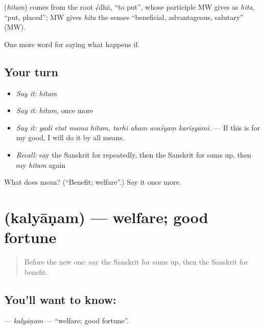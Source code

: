 \begin{cousinweb}
\textbf{} (\emph{hitam}) comes from the root √dhā, \textquotedblleft{}to put\textquotedblright{}, whose participle MW gives as \emph{hita}, \textquotedblleft{}put, placed\textquotedblright{}; MW gives \emph{hita} the senses \textquotedblleft{}beneficial, advantageous, salutary\textquotedblright{} (MW).
\end{cousinweb}

\begin{grammarlens}[title={What you've built}]
One more word for saying what happens if.
\end{grammarlens}

\subsection*{Your turn}
\begin{itemize}
\raggedright
  \item \emph{Say it:} \emph{hitam}
  \item \emph{Say it:} \emph{hitam}, once more
  \item \emph{Say it:} \emph{yadi etat mama hitam, tarhi aham avaśyaṃ kariṣyāmi.} — If this is for my good, I will do it by all means.
  \item \emph{Recall:} say the Sanskrit for repeatedly, then the Sanskrit for sums up, then say \emph{hitam} again
\end{itemize}

\begin{tcolorbox}[breakable,colback=teal!4,colframe=teal!35!black,title={Before you move on}]
What does  mean? (\textquotedblleft{}Benefit; welfare\textquotedblright{}.) Say it once more.
\end{tcolorbox}
\section[\texorpdfstring{\sk{कल्याणम्} (kalyāṇam)}{कल्याणम् (kalyāṇam)}]{ (kalyāṇam) — welfare; good fortune}

\label{lesson:SA-C382-kalyanam}



\begin{quote}
Before the new one: say the Sanskrit for sums up, then the Sanskrit for benefit.
\end{quote}

\subsection*{You'll want to know: }
\textbf{} — \emph{kalyāṇam} — \textquotedblleft{}welfare; good fortune\textquotedblright{}.

